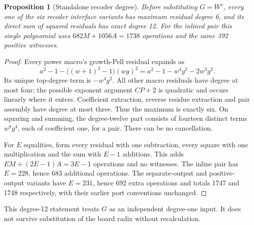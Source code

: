 \documentclass[11pt,letterpaper]{article}
\newtheorem{proposition}[theorem]{Proposition}
\theoremstyle{definition}\newtheorem{definition}[theorem]{Definition}
\theoremstyle{remark}\newtheorem{remark}[theorem]{Remark}
\begin{document}
\begin{proposition}[Standalone recoder degree]
Before substituting $G=W^v$, every one of the six recoder interface variants has maximum residual degree 6, and its direct sum of squared residuals has exact degree 12. For the inlined pair this single polynomial uses $682M+1056A=1738$ operations and the same 392 positive witnesses.
\end{proposition}
\begin{proof}
Every power macro's growth-Pell residual expands as
\[
 a^2-1-\bigl((w+1)^2-1\bigr)(wg)^2
 =a^2-1-w^4g^2-2w^3g^2.
\]
Its unique top-degree term is $-w^4g^2$. All other macro residuals have degree at most four; the possible exponent argument $CP+2$ is quadratic and occurs linearly where it enters. Coefficient extraction, reverse residue extraction and pair assembly have degree at most three. Thus the maximum is exactly six. On squaring and summing, the degree-twelve part consists of fourteen distinct terms $w^8g^4$, each of coefficient one, for a pair. There can be no cancellation.

For $E$ equalities, form every residual with one subtraction, every square with one multiplication and the sum with $E-1$ additions. This adds $EM+(2E-1)A=3E-1$ operations and no witnesses. The inline pair has $E=228$, hence 683 additional operations. The separate-output and positive-output variants have $E=231$, hence 692 extra operations and totals 1747 and 1748 respectively, with their earlier port conventions unchanged.
\end{proof}
This degree-12 statement treats $G$ as an independent degree-one input. It does not survive substitution of the board radix without recalculation.
\end{document}
